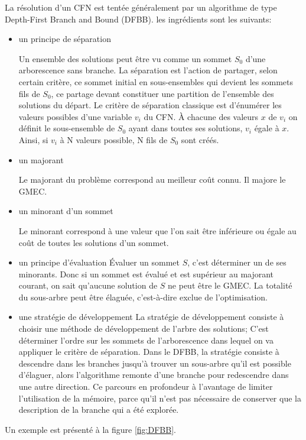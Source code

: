La résolution d'un CFN est tentée généralement par un algorithme de type  \og Depth-First Branch and Bound \fg (DFBB).
les ingrédients sont les suivants:
\begin{itemize}
\item un principe de séparation

Un ensemble des solutions peut être vu comme un sommet $S_0$ d'une arborescence sans branche.  
La séparation est l'action de partager, selon certain critère, ce sommet initial en sous-ensembles  qui devient les sommets fils de $S_0$, ce partage devant constituer une partition de l'ensemble des solutions du départ.
Le critère de séparation classique est d'énumérer les valeurs possibles d'une variable $v_i$ du  CFN. À chacune des valeurs $x$ de $v_i$ on définit le sous-ensemble de $S_0$ ayant dans toutes ses solutions, $v_i$ égale à $x$. Ainsi, si $v_i$ à N valeurs possible, N fils de $S_0$ sont créés.
\item un majorant
  
Le majorant du problème correspond au meilleur coût connu. Il majore le GMEC.
\item un minorant d'un sommet

Le minorant correspond à une valeur que l'on sait être inférieure ou égale au coût de toutes les solutions d'un sommet.  
\item un principe d'évaluation
Évaluer un sommet $S$, c'est déterminer un de ses minorants. Donc si un sommet est évalué et est supérieur au majorant courant, on sait qu'aucune solution de $S$ ne peut être le GMEC. La totalité du sous-arbre peut être élaguée, c'est-à-dire exclue de l'optimisation.  

\item une stratégie de développement
La stratégie de développement consiste à choisir une méthode de développement de l'arbre des solutions; C'est déterminer l'ordre sur les sommets de l'arborescence dans lequel on va appliquer le critère de séparation.
Dans le DFBB, la stratégie consiste à descendre dans les branches jusqu'à trouver un sous-arbre qu'il est possible d'élaguer, alors l'algorithme remonte d'une branche pour redescendre dans une autre direction. Ce parcours en profondeur à l'avantage de limiter l'utilisation de la mémoire, parce qu'il n'est pas nécessaire de conserver que la description de la branche qui a été explorée.
\end{itemize}  
Un exemple est présenté à la figure \ref{fig:DFBB}.


